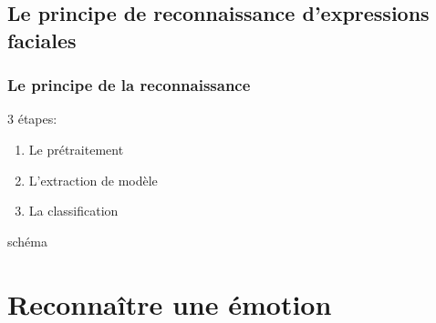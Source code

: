 \documentclass{beamer}
\begin{document}

\subsection{Le principe de reconnaissance d'expressions faciales}
\begin{frame}
  \frametitle{Le principe de la reconnaissance}
  3 étapes:
  \begin{enumerate}
    \item Le prétraitement
    \item L'extraction de modèle
    \item La classification
  \end{enumerate}
  schéma
\end{frame}

\section{Reconnaître une émotion}
\end{document}
